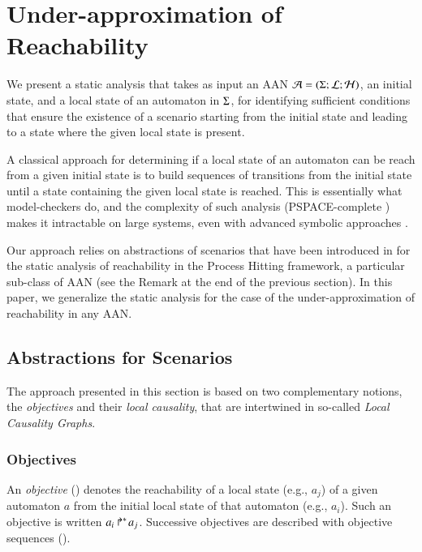 \section{Under-approximation of Reachability}\label{sec:sa}

We present a static analysis that takes as input an AAN
$\mathcal{A} = (\Sigma; \mathcal{L}; \mathcal{H})$,
an initial state, and a local state of an automaton in $\Sigma$, for identifying sufficient conditions
that ensure the existence of a scenario starting from the initial state and leading to a state
where the given local state is present.

A classical approach for determining if a local state of an automaton can be reach from a
given initial state is to build sequences of transitions from the initial state until a state
containing the given local state is reached.
This is essentially what model-checkers do, and the complexity of such analysis (PSPACE-complete
\cite{Harel02}) makes it intractable on large systems, even with advanced symbolic approaches
\cite{PMR12-MSCS}.

Our approach relies on abstractions of scenarios that have been introduced in
\cite{PMR12-MSCS} for the static analysis of reachability in the Process Hitting framework,
a particular sub-class of AAN (see the Remark at the end of the previous section).
In this paper, we generalize the static analysis for the case of the under-approximation of
reachability in any AAN.


\subsection{Abstractions for Scenarios}
\label{ssec:abstr-sce}

The approach presented in this section is based on two complementary notions,
the \emph{objectives} and their \emph{local causality},
that are intertwined in so-called \emph{Local Causality Graphs}.

\subsubsection{Objectives}

An \emph{objective} () denotes the reachability of a local state (e.g., $a_j$) of a given automaton $a$
from the initial local state of that automaton (e.g., $a_i$).
Such an objective is written $\mbox{${a}_{i}\Rsh^*\!{a}_{j}$}$.
Successive objectives are described with objective sequences ().

